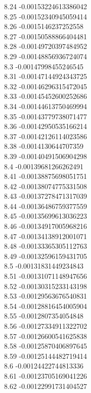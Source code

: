 {8.24	-0.00153224613386042\\
8.25	-0.00152340945059414\\
8.26	-0.0015146237252558\\
8.27	-0.00150588866404481\\
8.28	-0.00149720397484952\\
8.29	-0.00148856936724074\\
8.3	-0.00147998455246545\\
8.31	-0.00147144924343725\\
8.32	-0.00146296315472045\\
8.33	-0.00145452600252686\\
8.34	-0.00144613750469994\\
8.35	-0.00143779738071477\\
8.36	-0.00142950535166214\\
8.37	-0.00142126114023586\\
8.38	-0.0014130644707359\\
8.39	-0.00140491506904298\\
8.4	-0.00139681266262491\\
8.41	-0.00138875698051751\\
8.42	-0.00138074775331508\\
8.43	-0.00137278471317039\\
8.44	-0.00136486759377559\\
8.45	-0.00135699613036223\\
8.46	-0.00134917005968216\\
8.47	-0.00134138912001071\\
8.48	-0.00133365305112763\\
8.49	-0.00132596159431705\\
8.5	-0.00131831449234843\\
8.51	-0.00131071148947656\\
8.52	-0.00130315233143198\\
8.53	-0.00129563676540831\\
8.54	-0.00128816454005904\\
8.55	-0.0012807354054848\\
8.56	-0.00127334911322702\\
8.57	-0.00126600541625838\\
8.58	-0.00125870406897645\\
8.59	-0.00125144482719414\\
8.6	-0.00124422744813336\\
8.61	-0.00123705169041226\\
8.62	-0.00122991731404527\\
}

